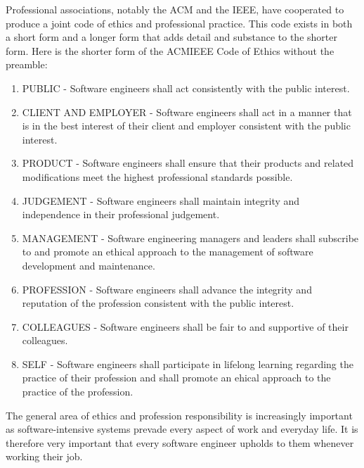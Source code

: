 Professional associations, notably the ACM and the IEEE, have cooperated to produce a joint code of ethics and professional practice. This code exists in both a short form and a longer form that adds detail and substance to the shorter form. Here is the shorter form of the ACM\/IEEE Code of Ethics without the preamble:
\begin{enumerate}
    \item PUBLIC - Software engineers shall act consistently with the public interest.
    \item CLIENT AND EMPLOYER - Software engineers shall act in a manner that is in the best interest of their client and employer consistent with the public interest.
    \item PRODUCT - Software engineers shall ensure that their products and related modifications meet the highest professional standards possible.
    \item JUDGEMENT - Software engineers shall maintain integrity and independence in their professional judgement.
    \item MANAGEMENT - Software engineering managers and leaders shall subscribe to and promote an ethical approach to the management of software development and maintenance.
    \item PROFESSION - Software engineers shall advance the integrity and reputation of the profession consistent with the public interest.
    \item COLLEAGUES - Software engineers shall be fair to and supportive of their colleagues.
    \item SELF - Software engineers shall participate in lifelong learning regarding the practice of their profession and shall promote an ehical approach to the practice of the profession.
\end{enumerate}

The general area of ethics and profession responsibility is increasingly important as software-intensive systems prevade every aspect of work and everyday life. It is therefore very important that every software engineer upholds to them whenever working their job.